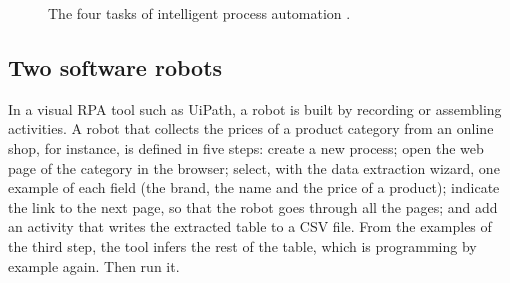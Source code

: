 \begin{figure}[htbp]
\centering
{}
\caption{The four tasks of intelligent process automation \citep{ferreira2020evaluation}.}
\label{fig:ipa}
\end{figure}

\subsection{Two software robots}

In a visual RPA tool such as UiPath, a robot is built by recording or assembling activities. A robot that
collects the prices of a product category from an online shop, for instance, is defined in five steps:
create a new process; open the web page of the category in the browser; select, with the data extraction wizard, one example of each field (the brand, the name and the price of a product); indicate the link to the next page,
so that the robot goes through all the pages; and add an activity that writes the extracted table to a CSV
file. From the examples of the third step, the tool infers the rest of the table, which is programming by example again. Then run it.

